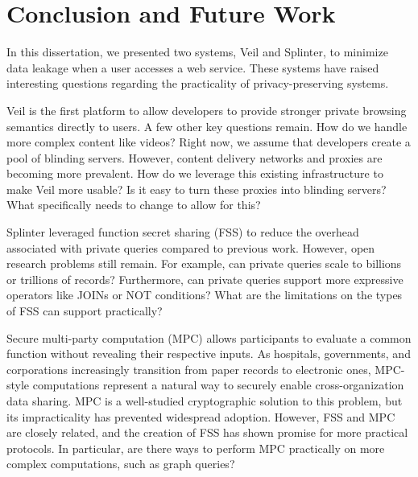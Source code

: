 \section{Conclusion and Future Work}
\label{chap:concl}

In this dissertation, we presented two systems, Veil and Splinter,
to minimize data leakage when a user accesses a web service. 
These systems have raised interesting questions
regarding the practicality of privacy-preserving systems.

Veil is the first platform to allow developers to provide stronger
private browsing semantics directly to users. A few other key questions remain.
How do we handle more complex content like videos? Right now, we assume
that developers create a pool of blinding servers. However, content delivery
networks and proxies are becoming more prevalent. How do we leverage this
existing infrastructure to make Veil more usable? Is it easy to turn
these proxies into blinding servers? What specifically needs to change to allow
for this? 

Splinter leveraged
function secret sharing (FSS) to reduce the overhead associated with private queries compared to previous
work. However, open research problems still remain. For example, can private queries scale to billions
or trillions of records? Furthermore, can private queries support more expressive operators like JOINs or
NOT conditions? What are the limitations on the types of FSS can support practically?

Secure multi-party computation (MPC) allows participants to evaluate a common function without revealing
their respective inputs. As hospitals, governments, and corporations increasingly transition from
paper records to electronic ones, MPC-style computations represent a natural way to securely enable
cross-organization data sharing. MPC is a well-studied cryptographic solution to this problem, but its
impracticality has prevented widespread adoption. However, FSS and MPC are closely related, and 
the creation of FSS has shown promise for more practical protocols. In particular,
are there ways to perform MPC practically on more complex computations, such as graph queries?



